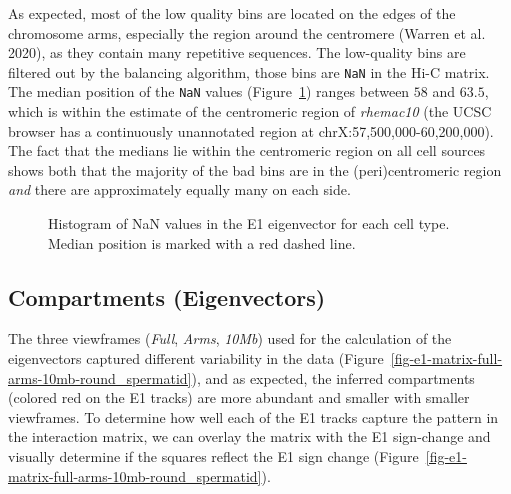 \documentclass[
  11pt,
  a4paper,
]{scrbook}
\let\oldemph\emph
\renewcommand\emph[1]{\oldemph{\color{gray}#1}}
\begin{document}
As expected, most of the low quality bins are located on the edges of
the chromosome arms, especially the region around the centromere (Warren
et al. 2020), as they contain many repetitive sequences. The low-quality
bins are filtered out by the balancing algorithm, those bins are
\texttt{NaN} in the Hi-C matrix. The median position of the \texttt{NaN}
values (Figure~\ref{fig-e1_nan_hist}) ranges between \(58\) and
\(63.5\), which is within the estimate of the centromeric region of
\emph{rhemac10} (the UCSC browser has a continuously unannotated region
at chrX:57,500,000-60,200,000). The fact that the medians lie within the
centromeric region on all cell sources shows both that the majority of
the bad bins are in the (peri)centromeric region \emph{and} there are
approximately equally many on each side.

\begin{figure}[H]


\caption{\label{fig-e1_nan_hist}Histogram of NaN values in the E1
eigenvector for each cell type. Median position is marked with a red
dashed line.}

\end{figure}%

\subsection{Compartments (Eigenvectors)}\label{sec-results-eigenvectors}

The three viewframes (\emph{Full}, \emph{Arms}, \emph{10Mb}) used for
the calculation of the eigenvectors captured different variability in
the data (Figure~\ref{fig-e1-matrix-full-arms-10mb-round_spermatid}),
and as expected, the inferred compartments (colored red on the E1
tracks) are more abundant and smaller with smaller viewframes. To
determine how well each of the E1 tracks capture the pattern in the
interaction matrix, we can overlay the matrix with the E1 sign-change
and visually determine if the squares reflect the E1 sign change
(Figure~\ref{fig-e1-matrix-full-arms-10mb-round_spermatid}).
\end{document}
